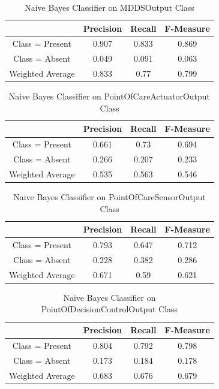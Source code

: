 \documentclass[11pt, notitlepage,abstracton,oneside]{article}   	%
\begin{document}
\begin{table}[htdp]
\caption{Naive Bayes Classifier on MDDSOutput Class}
\begin{center}
\begin{tabular}{|c|c|c|c|}
\hline
& Precision & Recall & F-Measure \\ \hline
Class = Present & 0.907 & 0.833 & 0.869 \\ \hline
Class = Absent & 0.049 & 0.091 & 0.063 \\ \hline
Weighted Average & 0.833 & 0.77 & 0.799 \\ \hline
\end{tabular}
\end{center}
\label{default}
\end{table}%

\begin{table}[htdp]
\caption{Naive Bayes Classifier on PointOfCareActuatorOutput Class}
\begin{center}
\begin{tabular}{|c|c|c|c|}
\hline
& Precision & Recall & F-Measure \\ \hline
Class = Present & 0.661 & 0.73 & 0.694 \\ \hline
Class = Absent & 0.266 & 0.207 & 0.233 \\ \hline
Weighted Average & 0.535 & 0.563 & 0.546 \\ \hline
\end{tabular}
\end{center}
\label{default}
\end{table}%

\begin{table}[htdp]
\caption{Naive Bayes Classifier on PointOfCareSensorOutput Class}
\begin{center}
\begin{tabular}{|c|c|c|c|}
\hline
& Precision & Recall & F-Measure \\ \hline
Class = Present & 0.793 & 0.647 & 0.712 \\ \hline
Class = Absent & 0.228 & 0.382 & 0.286 \\ \hline
Weighted Average & 0.671 & 0.59 & 0.621 \\ \hline
\end{tabular}
\end{center}
\label{default}
\end{table}%

\begin{table}[htdp]
\caption{Naive Bayes Classifier on PointOfDecisionControlOutput Class}
\begin{center}
\begin{tabular}{|c|c|c|c|}
\hline
& Precision & Recall & F-Measure \\ \hline
Class = Present & 0.804 & 0.792 & 0.798 \\ \hline
Class = Absent & 0.173 & 0.184 & 0.178 \\ \hline
Weighted Average & 0.683 & 0.676 & 0.679 \\ \hline
\end{tabular}
\end{center}
\label{default}
\end{table}%
\end{document}
